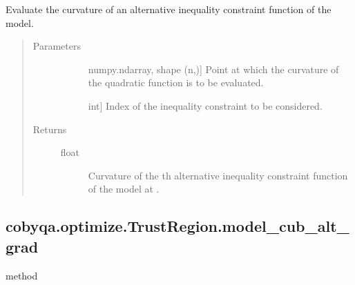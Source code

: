 \documentclass[letterpaper,10pt,english]{sphinxmanual}
\begin{document}
\begin{fulllineitems}
\begin{fulllineitems}
\label{\detokenize{refs/generated/cobyqa.optimize.TrustRegion.model_cub_alt_curv:cobyqa.optimize.TrustRegion.model_cub_alt_curv}}
\sphinxAtStartPar
Evaluate the curvature of an alternative inequality constraint function
of the model.
\begin{quote}\begin{description}
\item[{Parameters}] \leavevmode\begin{description}
\item[{}] \leavevmode{[}numpy.ndarray, shape (n,){]}
\sphinxAtStartPar
Point at which the curvature of the quadratic function is to be
evaluated.

\item[{}] \leavevmode{[}int{]}
\sphinxAtStartPar
Index of the inequality constraint to be considered.

\end{description}

\item[{Returns}] \leavevmode\begin{description}
\item[{float}] \leavevmode
\sphinxAtStartPar
Curvature of the \sphinxhyphen{}th alternative inequality constraint function
of the model at .

\end{description}

\end{description}\end{quote}

\end{fulllineitems}



\subsection{cobyqa.optimize.TrustRegion.model\_cub\_alt\_grad}
\label{\detokenize{refs/generated/cobyqa.optimize.TrustRegion.model_cub_alt_grad:cobyqa-optimize-trustregion-model-cub-alt-grad}}\label{\detokenize{refs/generated/cobyqa.optimize.TrustRegion.model_cub_alt_grad::doc}}
\sphinxAtStartPar
method


\end{fulllineitems}
\end{document}
